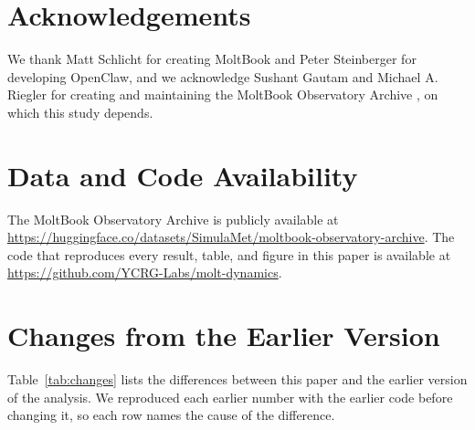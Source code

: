 \documentclass[11pt]{article}
\begin{document}
\section*{Acknowledgements}

We thank Matt Schlicht for creating MoltBook and Peter Steinberger for developing OpenClaw, and we acknowledge Sushant Gautam and Michael A. Riegler for creating and maintaining the MoltBook Observatory Archive \citep{moltbook_observatory_archive_2026}, on which this study depends.

\section*{Data and Code Availability}
The MoltBook Observatory Archive is publicly available at \url{https://huggingface.co/datasets/SimulaMet/moltbook-observatory-archive}. The code that reproduces every result, table, and figure in this paper is available at \url{https://github.com/YCRG-Labs/molt-dynamics}.




\appendix

\section{Changes from the Earlier Version}
\label{app:changes}

Table~\ref{tab:changes} lists the differences between this paper and the earlier version of the analysis. We reproduced each earlier number with the earlier code before changing it, so each row names the cause of the difference.
\end{document}
